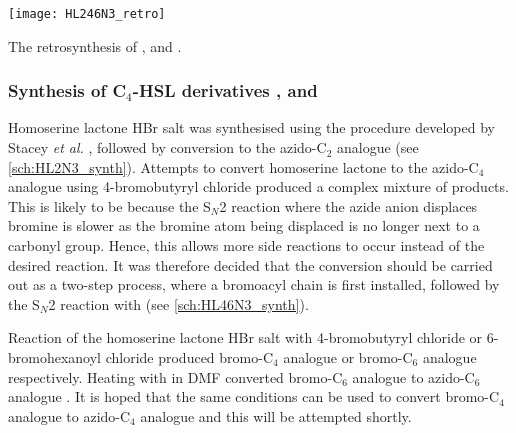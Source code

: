 \begin{scheme}[H]
	\begin{center}
		\texttt{[image: HL246N3\_retro]}
		\caption{The retrosynthesis of ,  and . \label{sch:HL246N3_retro}}
	\end{center}
\end{scheme}


\subsubsection{Synthesis of C$_4$-HSL derivatives ,  and \label{sec:HL4N3}}

Homoserine lactone HBr salt  was synthesised using the procedure developed by Stacey \textit{et al.} \cite{Stacy2013}, followed by conversion to the azido-C$_2$ analogue  (see \ref{sch:HL2N3_synth}). Attempts to convert homoserine lactone  to the azido-C$_4$ analogue using 4-bromobutyryl chloride  produced a complex mixture of products. This is likely to be because the S$_N$2 reaction where the azide anion displaces bromine is slower as the bromine atom being displaced is no longer next to a carbonyl group. Hence, this allows more side reactions to occur instead of the desired reaction. It was therefore decided that the conversion should be carried out as a two-step process, where a bromoacyl chain is first installed, followed by the S$_N$2 reaction with  (see \ref{sch:HL46N3_synth}). 

Reaction of the homoserine lactone HBr salt  with 4-bromobutyryl chloride  or 6-bromohexanoyl chloride  produced bromo-C$_4$ analogue  or bromo-C$_6$ analogue  respectively. Heating with  in DMF converted bromo-C$_6$ analogue  to azido-C$_6$ analogue \cite{Baker2012}. It is hoped that the same conditions can be used to convert bromo-C$_4$ analogue  to azido-C$_4$ analogue  and this will be attempted shortly.

